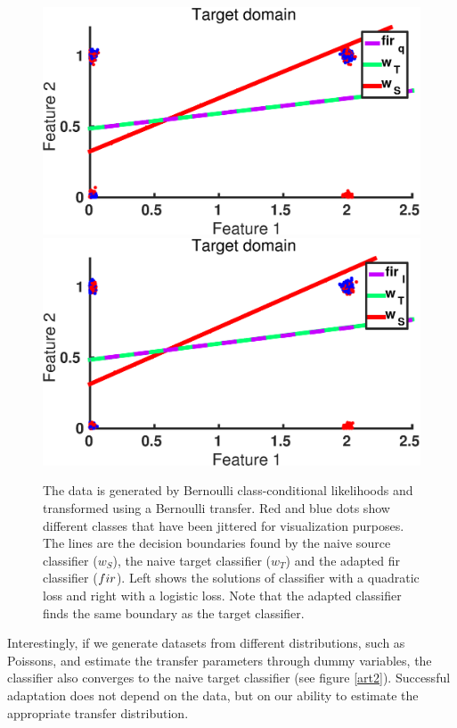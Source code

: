 \documentclass[twoside,11pt]{article}
\begin{document}
\begin{figure}[ht]
\centering
\includegraphics[width=.45\textwidth]{images/da_artexp_sens_model_convergence_Bern_square.eps} \hspace{5px}
\includegraphics[width=.45\textwidth]{images/da_artexp_sens_model_convergence_Bern_log.eps}
\caption{The data is generated by Bernoulli class-conditional likelihoods and transformed using a Bernoulli transfer. Red and blue dots show different classes that have been jittered for visualization purposes. The lines are the decision boundaries found by the naive source classifier ($w_{S}$), the naive target classifier ($w_{T}$) and the adapted {\sc fir} classifier (${\sc fir}$). Left shows the solutions of classifier with a quadratic loss and right with a logistic loss. Note that the adapted classifier finds the same boundary as the target classifier.}
\label{art1}
\end{figure}

Interestingly, if we generate datasets from different distributions, such as Poissons, and estimate the transfer parameters through dummy variables, the classifier also converges to the naive target classifier (see figure \ref{art2}). Successful adaptation does not depend on the data, but on our ability to estimate the appropriate transfer distribution. 
\end{document}
